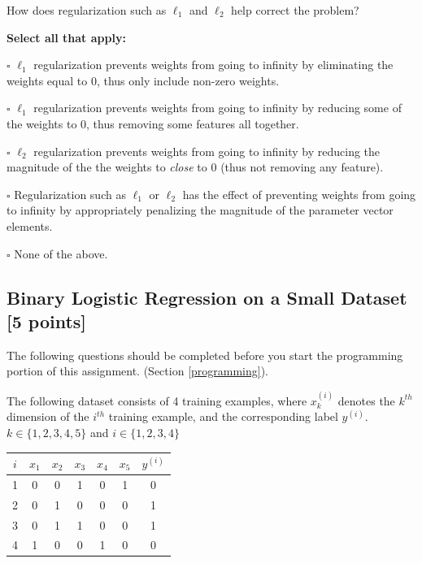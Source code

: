 \documentclass[11pt]{exam}
\numberwithin{equation}{section} %
\numberwithin{figure}{section} %
\numberwithin{table}{section} %
\begin{document}
\begin{questions}
\begin{your_solution}
  
    \end{your_solution}
    
    \clearpage
         
    \question [2] How does regularization such as $\ell_1$ and $\ell_2$ help correct the problem?
    
    \textbf{Select all that apply:}
    \begin{list}{}
        \item $\square$ $\ell_1$ regularization prevents weights from going to infinity by eliminating the weights equal to 0, thus only include non-zero weights.
        \item $\square$ $\ell_1$ regularization prevents weights from going to infinity by reducing some of the weights to 0, thus removing some features all together. 
        \item $\square$ $\ell_2$ regularization prevents weights from going to infinity by reducing the magnitude of the the weights to \textit{close} to 0 (thus not removing any feature). 
        \item $\square$ Regularization such as $\ell_1$ or $\ell_2$ has the effect of preventing weights from going to infinity by appropriately penalizing the magnitude of the parameter vector elements.
        \item $\square$ None of the above.
    \end{list}

    
    \clearpage
   
    
\end{questions}
 \subsection{Binary Logistic Regression on a Small Dataset [5 points]}
 \label{sec:warm-up}
 The following questions should be completed before you start the programming portion of this assignment. (Section \ref{programming}).
 
 The following dataset consists of 4 training examples, where $x_k^{(i)}$ denotes the $k^{th}$ dimension of the $i^{th}$ training example, and the corresponding label $y^{(i)}$. $k \in \{1, 2, 3, 4, 5\}$ and $i \in \{1, 2, 3, 4\}$

\begin{center}
\begin{tabular}{|c|c|c|c|c|c|c|}
\hline
$i$ & $x_{1}$ & $x_{2}$ & $x_{3}$ & $x_{4}$ & $x_{5}$ & $y^{(i)}$ \\ \hline
1 & 0 & 0 & 1 & 0 & 1 & 0   \\ \hline
2 & 0 & 1 & 0 & 0 & 0 & 1     \\ \hline
3 & 0 & 1 & 1 & 0 & 0 & 1    \\ \hline
4 & 1 & 0 & 0 & 1 & 0 & 0   \\ \hline

\end{tabular}
\end{center}
\end{document}
